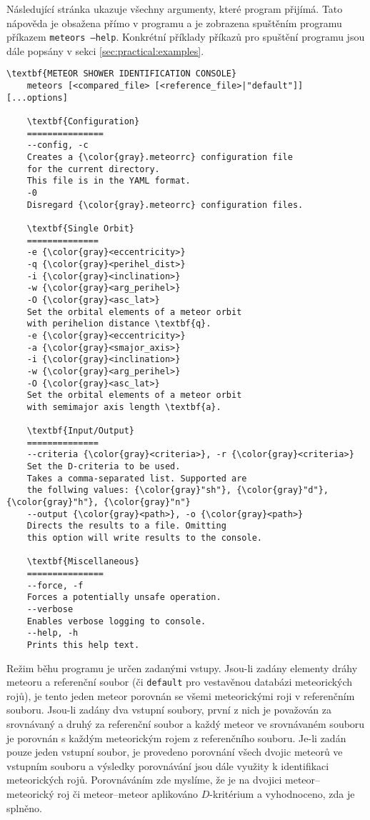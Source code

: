 \medskip

Následující stránka ukazuje všechny argumenty, které program přijímá. Tato nápověda je obsažena přímo v programu a je zobrazena spuštěním programu příkazem \texttt{meteors ---help}. Konkrétní příklady příkazů pro spuštění programu jsou dále popsány v sekci \ref{sec:practical:examples}.

\pagebreak
\begin{Verbatim}[commandchars=\\\{\},gobble=4,formatcom=\footnotesize,codes={\catcode`$=3\catcode`^=7},frame=lines]
    \textbf{METEOR SHOWER IDENTIFICATION CONSOLE}
    meteors [<compared_file> [<reference_file>|"default"]] [...options]

    \textbf{Configuration}
    ===============
    --config, -c
    Creates a {\color{gray}.meteorrc} configuration file
    for the current directory.
    This file is in the YAML format.
    -0
    Disregard {\color{gray}.meteorrc} configuration files.

    \textbf{Single Orbit}
    ==============
    -e {\color{gray}<eccentricity>}
    -q {\color{gray}<perihel_dist>}
    -i {\color{gray}<inclination>}
    -w {\color{gray}<arg_perihel>}
    -O {\color{gray}<asc_lat>}
    Set the orbital elements of a meteor orbit
    with perihelion distance \textbf{q}.
    -e {\color{gray}<eccentricity>}
    -a {\color{gray}<smajor_axis>}
    -i {\color{gray}<inclination>}
    -w {\color{gray}<arg_perihel>}
    -O {\color{gray}<asc_lat>}
    Set the orbital elements of a meteor orbit
    with semimajor axis length \textbf{a}.

    \textbf{Input/Output}
    ==============
    --criteria {\color{gray}<criteria>}, -r {\color{gray}<criteria>}
    Set the D-criteria to be used.
    Takes a comma-separated list. Supported are
    the follwing values: {\color{gray}"sh"}, {\color{gray}"d"}, {\color{gray}"h"}, {\color{gray}"n"}
    --output {\color{gray}<path>}, -o {\color{gray}<path>}
    Directs the results to a file. Omitting
    this option will write results to the console.

    \textbf{Miscellaneous}
    ===============
    --force, -f
    Forces a potentially unsafe operation.
    --verbose
    Enables verbose logging to console.
    --help, -h
    Prints this help text.
\end{Verbatim}
\pagebreak

Režim běhu programu je určen zadanými vstupy. Jsou-li zadány elementy dráhy meteoru a referenční soubor (či \texttt{default} pro vestavěnou databázi meteorických rojů), je tento jeden meteor porovnán se všemi meteorickými roji v referenčním souboru. Jsou-li zadány dva vstupní soubory, první z nich je považován za srovnávaný a druhý za referenční soubor a každý meteor ve srovnávaném souboru je porovnán s každým meteorickým rojem z referenčního souboru. Je-li zadán pouze jeden vstupní soubor, je provedeno porovnání všech dvojic meteorů ve vstupním souboru a výsledky porovnávání jsou dále využity k identifikaci meteorických rojů. Porovnáváním zde myslíme, že je na dvojici meteor--meteorický roj či meteor--meteor aplikováno $D$-kritérium a vyhodnoceno, zda je splněno.

